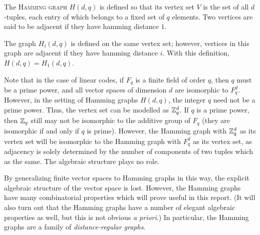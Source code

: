 \documentclass{report}
\begin{document}
    \begin{defn}\label{hamming-graph}
      The \textsc{Hamming graph} $H(d, q)$ is defined so that its vertex set $V$
      is the set of all $d$-tuples, each entry of which belongs to a fixed set
      of $q$ elements.  Two vertices are said to be adjacent if they have
      hamming distance $1$.

      The graph $H_i(d, q)$ is defined on the same vertex set; however, vertices
      in this graph are adjacent if they have hamming distance $i$.  With this
      definition, $H(d, q) = H_1(d, q)$.
    \end{defn}

    Note that in the case of linear codes, if $F_q$ is a finite field of order
    $q$, then $q$ must be a prime power, and all vector spaces of dimension $d$
    are isomorphic to $F_q^d$.  However, in the setting of Hamming graphs $H(d,
    q)$, the integer $q$ need not be a prime power.  Thus, the vertex set can
    be modelled as $\mathbb{Z}_q^d$.  If $q$ is a prime power, then $\mathbb{Z}_q$ still may not
    be isomorphic to the additive group of $F_q$ (they are isomorphic if and only if
    $q$ is prime).  However, the Hamming graph with $\mathbb{Z}_q^d$ as its vertex set
    will be isomorphic to the Hamming graph with $F_q^d$ as its vertex set, as
    adjacency is solely determined by the number of components of two tuples
    which as the same.  The algebraic structure plays no role.

    By generalizing finite vector spaces to Hamming graphs in this way, the
    explicit algebraic structure of the vector space is lost.  However, the
    Hamming graphs have many combinatorial properties which will prove useful in
    this report.  (It will also turn out that the Hamming graphs have a number
    of elegant algebraic properties as well, but this is not obvious \textit{a
    priori}.)  In particular, the Hamming graphs are a family of
    \textit{distance-regular graphs}.
\end{document}
